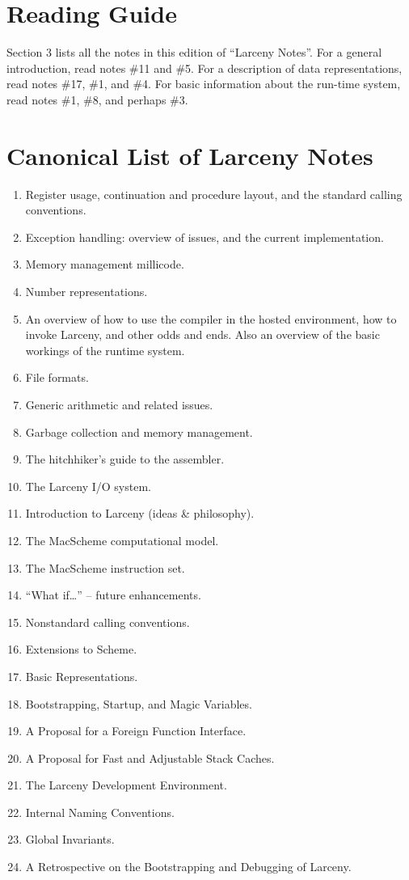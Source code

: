 \section{Reading Guide}

Section 3 lists all the notes in this edition of ``Larceny Notes''. For a
general introduction, read notes \#11 and \#5. For a description of
data representations, read notes \#17, \#1, and \#4. For basic information
about the run-time system, read notes \#1, \#8, and perhaps \#3.

\section{Canonical List of Larceny Notes}

\begin{enumerate}
\item Register usage, continuation and procedure layout, and 
the standard calling conventions.
\item Exception handling: overview of issues, and the current implementation.
\item Memory management millicode.
\item Number representations.
\item An overview of how to use the compiler in the hosted
environment, how to invoke Larceny, and other odds and ends. Also an
overview of the basic workings of the runtime system.
\item File formats.
\item Generic arithmetic and related issues.
\item Garbage collection and memory management.
\item The hitchhiker's guide to the assembler.
\item The Larceny I/O system.
\item Introduction to Larceny (ideas \& philosophy).
\item The MacScheme computational model.
\item The MacScheme instruction set.
\item ``What if\ldots''  --  future enhancements.
\item Nonstandard calling conventions.
\item Extensions to Scheme.
\item Basic Representations.
\item Bootstrapping, Startup, and Magic Variables.
\item A Proposal for a Foreign Function Interface.
\item A Proposal for Fast and Adjustable Stack Caches.
\item The Larceny Development Environment.
\item Internal Naming Conventions.
\item Global Invariants.
\item A Retrospective on the Bootstrapping and Debugging of Larceny.

\end{enumerate}


